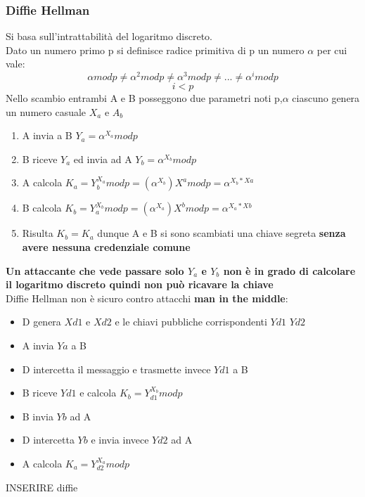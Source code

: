 \documentclass[12pt]{article}
\begin{document}
			\subsubsection{Diffie Hellman}
				Si basa sull'intrattabilità del logaritmo discreto.\\
				Dato un numero primo p si definisce radice primitiva di p un numero $\alpha$ per cui vale:
				$$\alpha modp \neq \alpha^{2} modp \neq \alpha^{3} modp \neq ... \neq \alpha^{i} modp  $$
				$$i<p $$
				Nello scambio entrambi A e B posseggono due parametri noti p,$\alpha$ ciascuno genera un numero casuale $X_{a}$ e $A_{b}$
				\begin{enumerate}
					\item A invia a B $Y_{a}= \alpha^{X_{a}} modp$
					\item B riceve $Y_{a}$ ed invia ad A $Y_{b}=\alpha^{X_{b}}modp$
					\item A calcola $K_{a} = Y_{b}^{X_{a}}modp = (\alpha^{X_{b}})X^{a}modp= \alpha^{X_{b}*X{a}}$
					\item B calcola $K_{b} = Y_{a}^{X_{b}}modp = (\alpha^{X_{a}})X^{b}modp= \alpha^{X_{a}*X{b}}$
					\item Risulta $K_{b} = K_{a}$ dunque A e B si sono scambiati una chiave segreta \textbf{senza avere nessuna credenziale comune}
 				\end{enumerate}	
 				\textbf{Un attaccante che vede passare solo $Y_{a}$ e $Y_{b}$ non è in grado di calcolare il logaritmo discreto quindi non può ricavare la chiave}\\
 				Diffie Hellman non è sicuro contro attacchi \textbf{man in the middle}:
 				\begin{itemize}
 					\item D genera $X{d1}$ e $X{d2}$ e le chiavi pubbliche corrispondenti $Y{d1}$ $Y{d2}$
 					\item A invia $Y{a}$ a B
 					\item D intercetta il messaggio e trasmette invece $Y{d1}$ a B
 					\item B riceve $Y{d1}$ e calcola $K_{b}= Y_{d1}^{X_{b}}modp$
 					\item B invia $Y{b}$ ad A
 					\item D intercetta $Y{b}$ e invia invece $Y{d2}$ ad A
 					\item A calcola $K_{a}= Y_{d2}^{X_{a}}modp$
 				\end{itemize}
 			
 				INSERIRE diffie\\
 			
\end{document}
